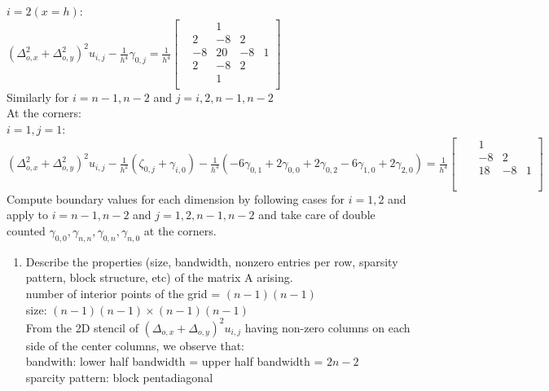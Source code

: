 \documentclass[12pt,letter]{article}
\begin{document}
\begin{enumerate}
  $i=2 (x=h)$:\\
  $(\Delta_{o,x}^2+\Delta_{o,y}^2)^2 u_{i,j} - \frac{1}{h^4} \gamma_{0,j} = \frac{1}{h^4}
  \begin{bmatrix}
    & & 1 & & \\
    & 2 & -8 & 2 &\\
    & -8 & 20 & -8 & 1\\
    & 2 & -8 & 2 &\\
    & & 1 & & \\
  \end{bmatrix}$\\

  Similarly for $i=n-1,n-2$ and $j=i,2,n-1,n-2$\\

  At the corners:\\
  $i=1,j=1$:\\
  $(\Delta_{o,x}^2+\Delta_{o,y}^2)^2 u_{i,j} - \frac{1}{h^2}(\zeta_{0,j}+\gamma_{i,0}) - \frac{1}{h^4} (-6 \gamma_{0,1}+ 2 \gamma_{0,0}+ 2 \gamma_{0,2} -6 \gamma_{1,0} + 2 \gamma_{2,0}) = \frac{1}{h^4}
  \begin{bmatrix}
    & & 1 & & \\
    & & -8 & 2 &\\
    & & 18 & -8 & 1\\
    & & & &\\
    & & & & \\
  \end{bmatrix}$\\

  Compute boundary values for each dimension by following cases for $i=1, 2$ and apply to $i=n-1,n-2$ and $j=1,2,n-1,n-2$ and take care of double counted $\gamma_{0,0}, \gamma_{n,n},\gamma_{0,n},\gamma_{n,0}$ at the corners.\\

  \pagebreak
  
  \begin{enumerate}
  \item Describe the properties (size, bandwidth, nonzero entries per row, sparsity pattern, block structure, etc) of the matrix A arising.\\


    number of interior points of the grid = $(n-1)(n-1)$\\
    size: $(n-1)(n-1) \times (n-1)(n-1)$\\
    
    From the 2D stencil of $(\Delta_{o,x}+\Delta_{o,y})^2 u_{i,j}$ having non-zero columns on each side of the center columns, we observe that:\\
    bandwith: lower half bandwidth = upper half bandwidth = $2n-2$\\
    sparcity pattern: block pentadiagonal\\
    

\end{enumerate}
\end{enumerate}
\end{document}
